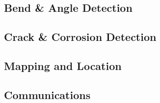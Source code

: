 \documentclass[11pt]{article}		%
\begin{document}
		\subsection{Bend \& Angle Detection}
		
		\subsection{Crack \& Corrosion Detection}
		
		\subsection{Mapping and Location}
		
		\subsection{Communications}
	
	\pagebreak		%
	
	
	\nocite{*} 				%
	
	\begingroup\onehalfspacing
		{\small
			
			
		}
	\endgroup
\end{document}
